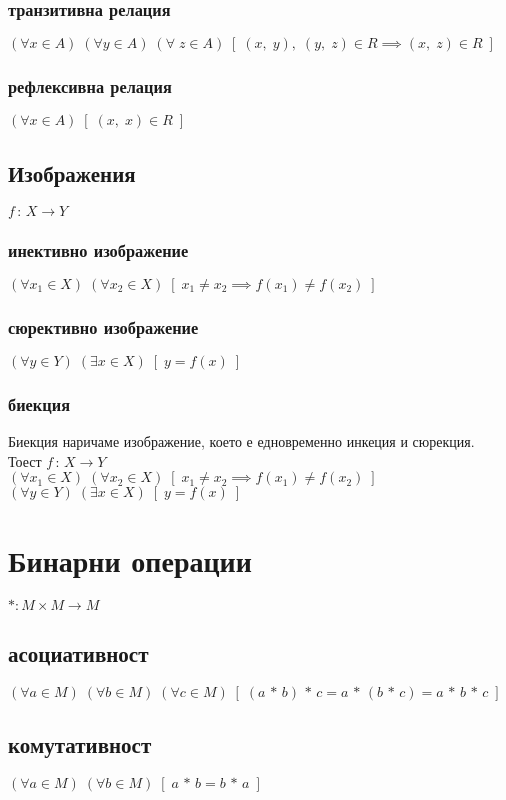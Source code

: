\documentclass[12pt]{article}
\begin{document}
    \subsubsection{транзитивна релация}
    \((\forall x \in A) \; (\forall y \in A) \; (\forall \; z \in A) \; [\; (x, \; y), \; (y, \; z) \in R \implies (x, \; z) \in R \;]\)
    \subsubsection{рефлексивна релация}
    \((\forall x \in A) \; [\; (x, \; x) \in R \;]\)
    \subsection{Изображения}
    \(f \, : \, X \to Y\)\\
    \subsubsection{инективно изображение}
    \((\forall x_1 \in X) \; (\forall x_2 \in X) \; [\; x_1 \neq x_2 \implies f(x_1) \neq f(x_2) \;]\)
    \subsubsection{сюрективно изображение}
    \((\forall y \in Y) \; (\exists x \in X) \; [\; y = f(x) \;]\)
    \subsubsection{биекция}
    Биекция наричаме изображение, което е едновременно инкеция и сюрекция. Тоест
    \(f \, : \, X \to Y\)\\
    \((\forall x_1 \in X) \; (\forall x_2 \in X) \; [\; x_1 \neq x_2 \implies f(x_1) \neq f(x_2) \;]\)\\
    \((\forall y \in Y) \; (\exists x \in X) \; [\; y = f(x) \;]\)
    \section{Бинарни операции}
    \(*: M  \times M \to M\)
    \subsection{асоциативност}
    \((\forall a \in M) \; (\forall b \in M) \; (\forall c \in M ) \; [\; (a \, * \, b) \, * \, c = a \, * \, (b \, * \, c) = a \, * \, b \, * \, c \;]\)
    \subsection{комутативност}
    \((\forall a \in M) \; (\forall b \in M) \; [\; a \, * \, b = b \, * \, a\;]\)
\end{document}
